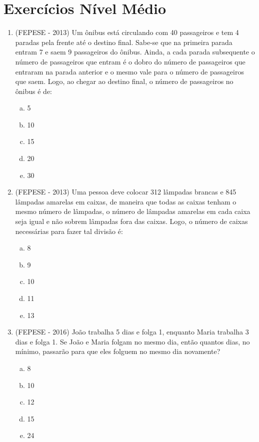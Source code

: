   \newpage
 
 \section{Exercícios Nível Médio}
 \begin{enumerate}
  \item (FEPESE - 2013) Um ônibus está circulando com 40 passageiros e tem 4 paradas pela frente até o destino final. Sabe-se que na primeira parada entram 7 e saem 9 passageiros do ônibus. Ainda, a cada parada subsequente o número de passageiros que entram é o dobro do número de passageiros que entraram na parada anterior e o mesmo vale para o número de passageiros que saem. Logo, ao chegar ao destino final, o número de passageiros no ônibus é de:
 \begin{enumerate}[a)]
 \item 5
 \item 10
 \item 15
 \item 20
 \item 30
 \end{enumerate}
 
  \item (FEPESE - 2013) Uma pessoa deve colocar 312 lâmpadas brancas e 845 lâmpadas amarelas em caixas, de maneira que todas as caixas tenham o mesmo número de lâmpadas, o número de lâmpadas amarelas em cada caixa seja igual e não sobrem lâmpadas fora das caixas. Logo, o número de caixas necessárias para fazer tal divisão é:
  \begin{enumerate}[a)]
  \item 8
  \item 9
  \item 10
  \item 11
  \item 13
  \end{enumerate}

  
  \item (FEPESE - 2016) João trabalha 5 dias e folga 1, enquanto Maria trabalha 3 dias e folga 1. Se João e Maria folgam no mesmo dia, então quantos dias, no mínimo, passarão para que eles folguem no mesmo dia novamente?
  \begin{enumerate}[a)]
  \item 8
  \item 10
  \item 12
  \item 15
  \item 24
  \end{enumerate}
  

\end{enumerate}
